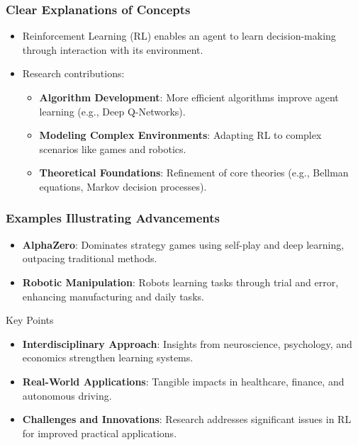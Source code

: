 \documentclass[aspectratio=169]{beamer}
\begin{document}
\begin{frame}[fragile]
    \frametitle{Clear Explanations of Concepts}
    \begin{itemize}
        \item Reinforcement Learning (RL) enables an agent to learn decision-making through interaction with its environment.
        \item Research contributions:
        \begin{itemize}
            \item \textbf{Algorithm Development}: More efficient algorithms improve agent learning (e.g., Deep Q-Networks).
            \item \textbf{Modeling Complex Environments}: Adapting RL to complex scenarios like games and robotics.
            \item \textbf{Theoretical Foundations}: Refinement of core theories (e.g., Bellman equations, Markov decision processes).
        \end{itemize}
    \end{itemize}
\end{frame}

\begin{frame}[fragile]
    \frametitle{Examples Illustrating Advancements}
    \begin{itemize}
        \item \textbf{AlphaZero}: Dominates strategy games using self-play and deep learning, outpacing traditional methods.
        \item \textbf{Robotic Manipulation}: Robots learning tasks through trial and error, enhancing manufacturing and daily tasks.
    \end{itemize}
    \begin{block}{Key Points}
        \begin{itemize}
            \item \textbf{Interdisciplinary Approach}: Insights from neuroscience, psychology, and economics strengthen learning systems.
            \item \textbf{Real-World Applications}: Tangible impacts in healthcare, finance, and autonomous driving.
            \item \textbf{Challenges and Innovations}: Research addresses significant issues in RL for improved practical applications.
        \end{itemize}
    \end{block}
\end{frame}
\end{document}
